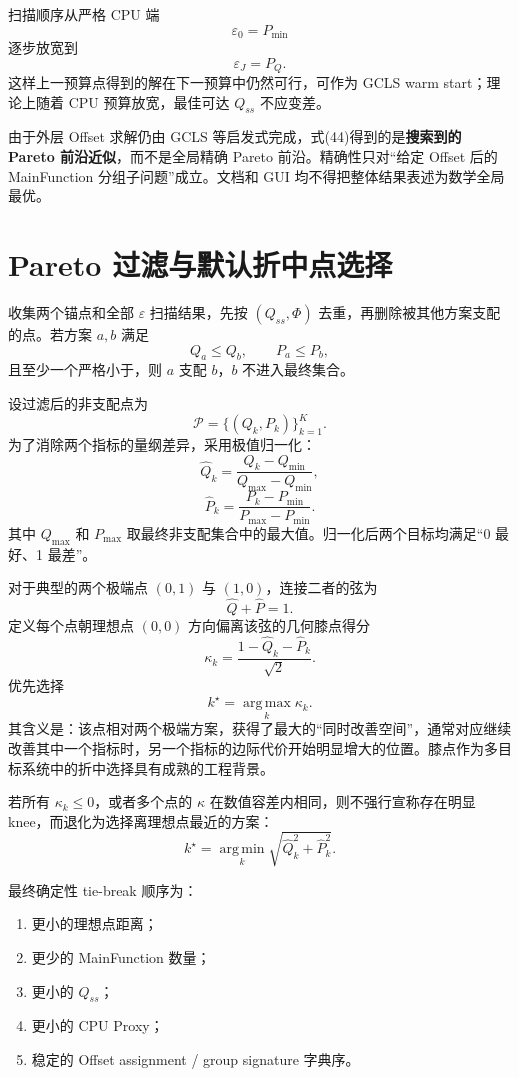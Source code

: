 \documentclass[11pt,a4paper,fontset=none]{ctexart}
\newcommand{\argmin}{\operatorname*{arg\,min}}
\newcommand{\argmax}{\operatorname*{arg\,max}}
\newcommand{\Pareto}{\mathcal{P}}
\begin{document}
扫描顺序从严格 CPU 端
\[
\varepsilon_0=P_{\min}
\]
逐步放宽到
\[
\varepsilon_J=P_Q.
\]
这样上一预算点得到的解在下一预算中仍然可行，可作为 GCLS warm start；理论上随着 CPU 预算放宽，最佳可达 $Q_{ss}$ 不应变差。

由于外层 Offset 求解仍由 GCLS 等启发式完成，式(44)得到的是\textbf{搜索到的 Pareto 前沿近似}，而不是全局精确 Pareto 前沿。精确性只对“给定 Offset 后的 MainFunction 分组子问题”成立。文档和 GUI 均不得把整体结果表述为数学全局最优。

\section{Pareto 过滤与默认折中点选择}

收集两个锚点和全部 $\varepsilon$ 扫描结果，先按 $(Q_{ss},\Phi)$ 去重，再删除被其他方案支配的点。若方案 $a,b$ 满足
\[
Q_a\le Q_b,
\qquad
P_a\le P_b,
\tag{46}
\]
且至少一个严格小于，则 $a$ 支配 $b$，$b$ 不进入最终集合。

设过滤后的非支配点为
\[
\Pareto=\{(Q_k,P_k)\}_{k=1}^{K}.
\]
为了消除两个指标的量纲差异，采用极值归一化：
\[
\hat Q_k
=\frac{Q_k-Q_{\min}}{Q_{\max}-Q_{\min}},
\tag{47}
\]
\[
\hat P_k
=\frac{P_k-P_{\min}}{P_{\max}-P_{\min}}.
\tag{48}
\]
其中 $Q_{\max}$ 和 $P_{\max}$ 取最终非支配集合中的最大值。归一化后两个目标均满足“0 最好、1 最差”。

对于典型的两个极端点 $(0,1)$ 与 $(1,0)$，连接二者的弦为
\[
\hat Q+\hat P=1.
\tag{49}
\]
定义每个点朝理想点 $(0,0)$ 方向偏离该弦的几何膝点得分
\[
\kappa_k
=\frac{1-\hat Q_k-\hat P_k}{\sqrt2}.
\tag{50}
\]
优先选择
\[
k^{\star}=\argmax_k\kappa_k.
\tag{51}
\]
其含义是：该点相对两个极端方案，获得了最大的“同时改善空间”，通常对应继续改善其中一个指标时，另一个指标的边际代价开始明显增大的位置。膝点作为多目标系统中的折中选择具有成熟的工程背景\cite{satopaa}。

若所有 $\kappa_k\le 0$，或者多个点的 $\kappa$ 在数值容差内相同，则不强行宣称存在明显 knee，而退化为选择离理想点最近的方案：
\[
k^{\star}
=\argmin_k
\sqrt{\hat Q_k^2+\hat P_k^2}.
\tag{52}
\]

最终确定性 tie-break 顺序为：
\begin{enumerate}
  \item 更小的理想点距离；
  \item 更少的 MainFunction 数量；
  \item 更小的 $Q_{ss}$；
  \item 更小的 CPU Proxy；
  \item 稳定的 Offset assignment / group signature 字典序。
\end{enumerate}
\end{document}
